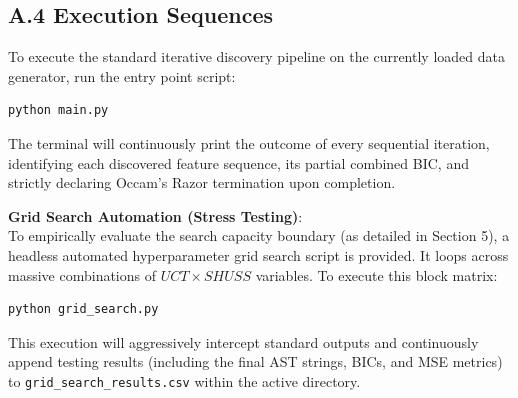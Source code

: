 \documentclass[11pt, a4paper]{article}
\begin{document}
\subsection*{A.4 Execution Sequences}
To execute the standard iterative discovery pipeline on the currently loaded data generator, run the entry point script:
\begin{verbatim}
python main.py
\end{verbatim}

The terminal will continuously print the outcome of every sequential iteration, identifying each discovered feature sequence, its partial combined BIC, and strictly declaring Occam's Razor termination upon completion.

\vspace{0.5cm}
\noindent \textbf{Grid Search Automation (Stress Testing)}:\\
To empirically evaluate the search capacity boundary (as detailed in Section 5), a headless automated hyperparameter grid search script is provided. It loops across massive combinations of $UCT \times SHUSS$ variables. To execute this block matrix:
\begin{verbatim}
python grid_search.py
\end{verbatim}
This execution will aggressively intercept standard outputs and continuously append testing results (including the final AST strings, BICs, and MSE metrics) to \texttt{grid\_search\_results.csv} within the active directory.
\end{document}
